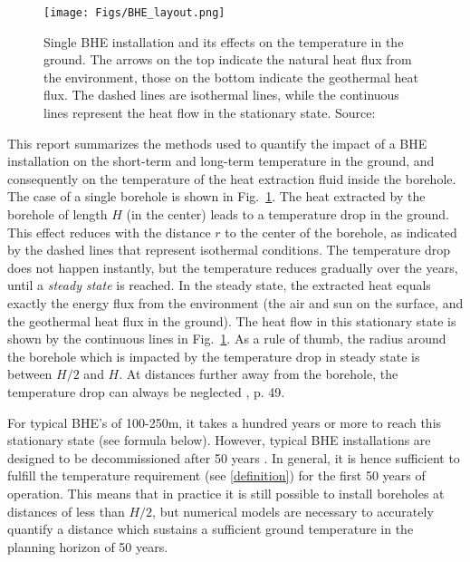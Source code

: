\begin{figure}
    \centering
    \texttt{[image: Figs/BHE\_layout.png]}
    \caption[Single BHE installation and its effects on the temperature in the ground.]{Single BHE installation and its effects on the temperature in the ground. The arrows on the top indicate the natural heat flux from the environment, those on the bottom indicate the geothermal heat flux. The dashed lines are isothermal lines, while the continuous lines represent the heat flow in the stationary state. Source: \citet{wagner_erdsondenpotenzial_2014}}
    \label{fig:BHE}
\end{figure}

This report summarizes the methods used to quantify the impact of a BHE installation on the short-term and long-term temperature in the ground, and consequently on the temperature of the heat extraction fluid inside the borehole. The case of a single borehole is shown in Fig.~\ref{fig:BHE}. The heat extracted by the borehole of length $H$ (in the center) leads to a temperature drop in the ground. This effect reduces with the distance $r$ to the center of the borehole, as indicated by the dashed lines that represent isothermal conditions. The temperature drop does not happen instantly, but the temperature reduces gradually over the years, until a \textit{steady state} is reached. In the steady state, the extracted heat equals exactly the energy flux from the environment (the air and sun on the surface, and the geothermal heat flux in the ground). The heat flow in this stationary state is shown by the continuous lines in Fig.~\ref{fig:BHE}. As a rule of thumb, the radius around the borehole which is impacted by the temperature drop in steady state is between $H/2$ and $H$. At distances further away from the borehole, the temperature drop can always be neglected \cite{pahud_geothermal_2002}, p. 49.

For typical BHE's of 100-250m, it takes a hundred years or more to reach this stationary state (see formula below). However, typical BHE installations are designed to be decommissioned after 50 years \citep{sia_sondes_2010}. In general, it is hence sufficient to fulfill the temperature requirement (see \ref{definition}) for the first 50 years of operation. This means that in practice it is still possible to install boreholes at distances of less than $H/2$, but numerical models are necessary to accurately quantify a distance which sustains a sufficient ground temperature in the planning horizon of 50 years.


